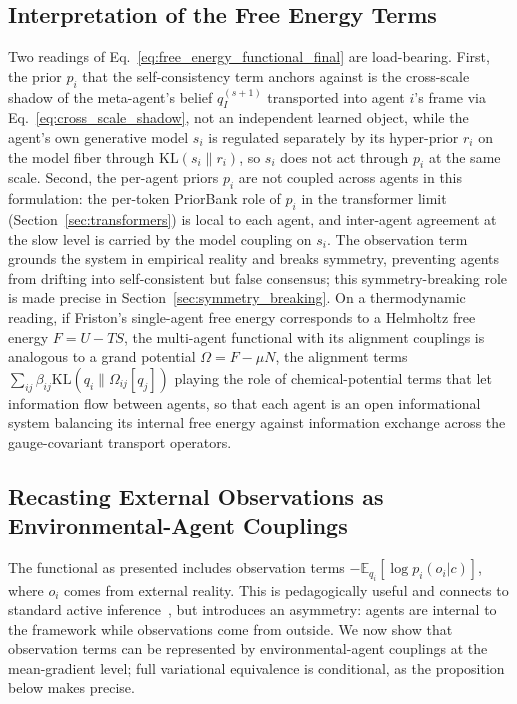 \documentclass[11pt]{article}
\begin{document}
\subsection{Interpretation of the Free Energy Terms}

Two readings of Eq.~\eqref{eq:free_energy_functional_final} are load-bearing. First, the prior $p_i$ that the self-consistency term anchors against is the cross-scale shadow of the meta-agent's belief $q_I^{(s+1)}$ transported into agent $i$'s frame via Eq.~\eqref{eq:cross_scale_shadow}, not an independent learned object, while the agent's own generative model $s_i$ is regulated separately by its hyper-prior $r_i$ on the model fiber through $\mathrm{KL}(s_i\|r_i)$, so $s_i$ does not act through $p_i$ at the same scale. Second, the per-agent priors $p_i$ are not coupled across agents in this formulation: the per-token PriorBank role of $p_i$ in the transformer limit (Section~\ref{sec:transformers}) is local to each agent, and inter-agent agreement at the slow level is carried by the model coupling on $s_i$. The observation term grounds the system in empirical reality and breaks symmetry, preventing agents from drifting into self-consistent but false consensus; this symmetry-breaking role is made precise in Section~\ref{sec:symmetry_breaking}. On a thermodynamic reading, if Friston's single-agent free energy corresponds to a Helmholtz free energy $F = U - TS$, the multi-agent functional with its alignment couplings is analogous to a grand potential $\Omega = F - \mu N$, the alignment terms $\sum_{ij} \beta_{ij}  \mathrm{KL}(q_i \| \Omega_{ij}[q_j])$ playing the role of chemical-potential terms that let information flow between agents, so that each agent is an open informational system balancing its internal free energy against information exchange across the gauge-covariant transport operators.

\subsection{Recasting External Observations as Environmental-Agent Couplings}

The functional as presented includes observation terms $-\mathbb{E}_{q_i}[\log p_i(o_i|c)]$, where $o_i$ comes from external reality. This is pedagogically useful and connects to standard active inference~\cite{Friston2010, parr2022active}, but introduces an asymmetry: agents are internal to the framework while observations come from outside. We now show that observation terms can be represented by environmental-agent couplings at the mean-gradient level; full variational equivalence is conditional, as the proposition below makes precise.
\end{document}
